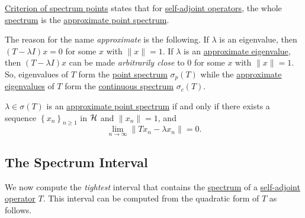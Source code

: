 \hyperref[col:criterion-of-spectrum-points]{Criterion of spectrum points} states that for \hyperref[def:self-adjoint-op]{self-adjoint operators}, the whole \hyperref[def:spectrum-point]{spectrum} is the \hyperref[def:approximate-point-spectrum]{approximate point spectrum}.

The reason for the name \emph{approximate} is the following. If \(\lambda\) is an eigenvalue, then \((T-\lambda I)x = 0\) for some \(x\) with \(\lVert x \rVert = 1\). If \(\lambda \) is an \hyperref[def:approximate-eigenvalue]{approximate eigenvalue}, then \((T-\lambda I)x\) can be made \emph{arbitrarily close} to \(0\) for some \(x\) with \(\lVert x \rVert = 1\). So, eigenvalues of \(T\) form the \hyperref[def:point-spectrum]{point spectrum} \(\sigma _p(T)\) while the \hyperref[def:approximate-eigenvalue]{approximate eigenvalues} of \(T\) form the \hyperref[def:continuous-spectrum]{continuous spectrum} \(\sigma _c(T)\).

\begin{remark}
	\(\lambda \in \sigma (T)\) is an \hyperref[def:approximate-point-spectrum]{approximate point spectrum} if and only if there exists a sequence \(\left\{ x_n \right\} _{n\geq 1}\) in \(\mathcal{\MakeUppercase{h}} \) and \(\lVert x_n \rVert = 1\), and
	\[
		\lim_{n \to \infty} \lVert Tx_n - \lambda x_n \rVert = 0.
	\]
\end{remark}

\subsection{The Spectrum Interval}
We now compute the \emph{tightest} interval that contains the \hyperref[def:spectrum-point]{spectrum} of a \hyperref[def:self-adjoint-op]{self-adjoint operator} \(T\). This interval can be computed from the quadratic form of \(T\) as follows.

